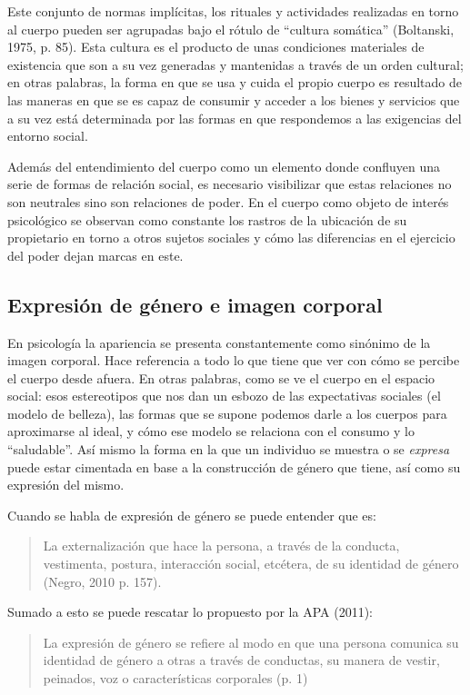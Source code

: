 Este conjunto de normas implícitas, los rituales y actividades realizadas en
torno al cuerpo pueden ser agrupadas bajo el rótulo de “cultura somática”
(Boltanski, 1975, p. 85).
Esta cultura es el producto de unas condiciones materiales de existencia que son
a su vez generadas y mantenidas a través de un orden cultural;
en otras palabras, la forma en que se usa y cuida el propio cuerpo es
resultado de las maneras en que se es capaz de consumir y acceder a los
bienes y servicios que a su vez está determinada por las formas en que
respondemos a las exigencias del entorno social.

Además del entendimiento del cuerpo como un elemento donde confluyen una serie
de formas de relación social, es necesario visibilizar que estas relaciones no
son neutrales sino son relaciones de poder.
En el cuerpo como objeto de interés psicológico se observan como constante los
rastros de la ubicación de su propietario en torno a otros sujetos sociales y
cómo las diferencias en el ejercicio del poder dejan marcas en este.

\subsection{Expresión de género e imagen corporal}
En psicología la apariencia se presenta constantemente como sinónimo de la
imagen corporal.
Hace referencia a todo lo que tiene que ver con cómo se percibe el cuerpo desde
afuera.
En otras palabras, como se ve el cuerpo en el espacio social: esos estereotipos
que nos dan un esbozo de las expectativas sociales (el modelo de belleza), las
formas que se supone podemos darle a los cuerpos para aproximarse al ideal, y
cómo ese modelo se relaciona con el consumo y lo “saludable”.
Así mismo la forma en la que un individuo se muestra o se \emph{expresa} puede
estar
cimentada en base a la construcción de género que tiene, así como su expresión
del mismo.

Cuando se habla de expresión de género se puede entender que es:

\begin{quote}
    La externalización que hace la persona, a través de la conducta, vestimenta,
    postura, interacción social, etcétera, de su identidad de género (Negro, 2010 p.
    157).
\end{quote}

Sumado a esto se puede rescatar lo propuesto por la APA (2011):

\begin{quote}
    La expresión de género se refiere al modo en que una persona comunica su
    identidad de género a otras a través de conductas, su manera de vestir,
    peinados, voz o características corporales (p. 1)
\end{quote}

